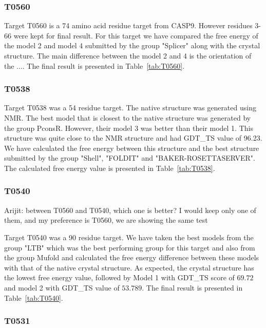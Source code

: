 \documentclass[12pt]{article}
\newcommand{\Alberto}[1]{\color{ForestGreen}#1\normalcolor }
\begin{document}
\subsubsection{T0560}

Target T0560 is a 74 amino acid residue target from CASP9. However residues 3-66 were kept for final
result.  For this target we have compared the free energy of the model 2 and model 4 submitted by
the group "Splicer" along with the crystal structure.  The main difference between the model 2 and 4
is the orientation of the ....  The final result is presented in Table~\protect\ref{tab:T0560}.

\subsubsection{T0538}

Target T0538 was a 54 residue target. The native structure was generated using NMR. The best model
that is closest to the native structure was generated by the group PconsR. However, their model 3
was better than their model 1. This structure was quite close to the NMR structure and had GDT\_TS
value of 96.23. We have calculated the free energy between this structure and the best structure
submitted by the group "Shell", "FOLDIT" and "BAKER-ROSETTASERVER". The calculated free energy value
is presented in Table~\protect\ref{tab:T0538}.

\subsubsection{T0540}
\Alberto{Arijit: between T0560 and T0540, which one is better? I would keep only one of them, and my
    preference is T0560, we are showing the same test}

Target T0540 was a 90 residue target. We have taken the best models from the group "LTB" which was
the best performing group for this target and also from the group Mufold and calculated the free
energy difference between these models with that of the native crystal structure.  As expected, the
crystal structure has the lowest free energy value, followed by Model 1 with GDT\_TS score of
$69.72$ and model 2 with GDT\_TS value of $53.789$. The final result is presented in
Table~\protect\ref{tab:T0540}.


\subsubsection{T0531}
\end{document}
